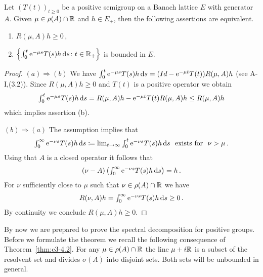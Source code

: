\begin{lemma}\label{lem:c3-4.7}
Let $(T(t))_{t \geq 0}$ be a positive semigroup on a Banach
lattice $E$ with generator $A$. Given $\mu \in \rho(A) \cap \mathbb{R} $ and $h \in E_+$, then the following assertions are equivalent.
\begin{enumerate}[\upshape (a)]
	\item 
	$R(\mu,A)h \geq 0$\,,

	\item 
	$\left\{\int_{0}^{t} \mathrm{e}^{-\mu s}T(s)h \mathop{}\!\mathrm{d}{s} \colon t \in \mathbb{R} _+\right\}$ is bounded in $E$.
\end{enumerate}
\end{lemma}
\begin{proof}
$(a)\Rightarrow(b)$  We have
$\int_{0}^{t} \mathrm{e}^{-\mu s}T(s)h \mathop{}\!\mathrm{d}{s} = (Id - \mathrm{e}^{-\mu t}T(t))R(\mu,A)h$ (see A-I,\;(3.2)).
Since $R(\mu,A)h \geq 0$ and $T(t)$ is a positive operator we obtain
\[\textstyle
\int_{0}^{t} \mathrm{e}^{-\mu s}T(s)h \mathop{}\!\mathrm{d}{s} = R(\mu,A)h - \mathrm{e}^{-\mu t}T(t)R(\mu,A)h \leq R(\mu,A)h
\] 
which implies assertion (b).

$(b)\Rightarrow(a)$  The assumption implies that 
\[\textstyle
\int_{0}^{\infty} \mathrm{e}^{-\nu s}T(s)h \mathop{}\!\mathrm{d}{s} \coloneqq 
\lim_{t \to \infty} \int_{0}^{t} \mathrm{e}^{-\nu s}T(s)h \mathop{}\!\mathrm{d}{s} \ \text{ exists for } \ \nu > \mu\,. 
\]
Using that $A$ is a closed operator it follows that 
\[\textstyle
(\nu - A)\left(\int_{0}^{\infty} \mathrm{e}^{-\nu s}T(s)h \mathop{}\!\mathrm{d}{s}\right) = h\,.
\]
For $\nu$
sufficiently close to $\mu$ such that $\nu \in \rho(A) \cap \mathbb{R} $ we have 
\[\textstyle
R(\nu,A)h = \int_{0}^{\infty} \mathrm{e}^{-\nu s}T(s)h \mathop{}\!\mathrm{d}{s} \geq 0\,. 
\] 
By continuity we conclude $R(\mu,A)h \geq 0$.
\end{proof}
By now we are prepared to prove the spectral decomposition for positive groups. Before we formulate the theorem we recall the following
consequence of Theorem~\ref{thm:c3-4.2}. For any $\mu \in \rho(A) \cap \mathbb{R} $ the line $\mu+i\mathbb{R} $ is a
subset of the resolvent set and divides $\sigma(A)$ into disjoint sets.
Both sets will be unbounded in general.

